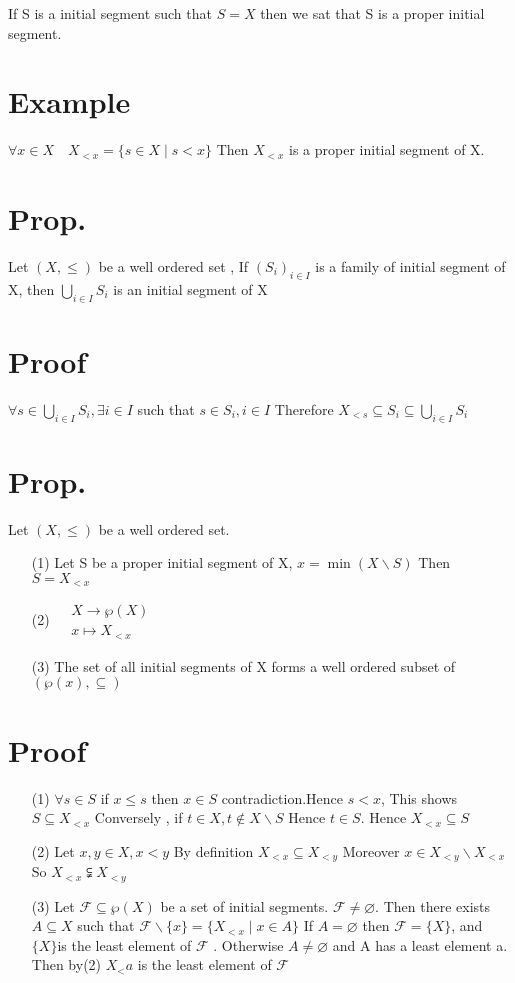 \documentclass{book}
\begin{document}
If S is a initial segment such that $S=X$ then we sat that S is a proper initial segment.
\section{Example}$\forall x\in X\quad X_{<x}=\{s\in X\mid s<x\}$ Then $X_{<x}$ is a proper initial segment of X.
\section{Prop.}Let $(X,\leq)$ be a well ordered set , If $(S_i)_{i\in I}$ is a family of initial segment of X, then $\bigcup\limits_{i\in I}S_i$ is an initial segment of X
\section{Proof}
$\forall s\in \bigcup\limits_{i\in I}S_i,\exists i\in I$ such that $s\in S_i,i\in I$ Therefore $X_{<s}\subseteq S_i\subseteq\bigcup\limits_{i\in I}S_i$
\section{Prop.}
Let $(X,\leq)$ be a well ordered set.
\begin{itemize}
    \item[(1)] Let S be a proper initial segment of X, $x= \min(X\backslash S)$ Then $S=X_{<x}$
    \item[(2)] $\begin{aligned}
        &X\rightarrow\wp(X)\\ &x\mapsto X_{<x}
    \end{aligned}$
    \item[(3)] The set of all initial segments of X forms a well ordered subset of $(\wp(x),\subseteq)$
\end{itemize}
\section{Proof}
\begin{itemize}
    \item [(1)] $\forall s\in S$ if $x\leq s$ then $x\in S$ contradiction.Hence $s<x$, This shows $S\subseteq X_{<x}$ Conversely , if $t\in X, t\not\in X\backslash S$ Hence $t\in S.$ Hence $X_{<x}\subseteq S$
    \item [(2)]Let $x,y\in X,x<y$ By definition $X_{<x}\subseteq X_{<y}$ Moreover $x\in X_{<y}\backslash X_{<x}$ So $X_{<x}\subsetneqq X_{<y}$
    \item [(3)]Let $\mathcal{F}\subseteq\wp(X)$ be a set of initial segments. $\mathcal{F}\not=\varnothing$. Then there exists $A\subseteq X$ such that $\mathcal{F}\backslash \{x\}=\{X_{<x}\mid x\in A\}$ If $A=\varnothing$ then $\mathcal{F}=\{X\}$, and $\{X\}$is the least element of $\mathcal{F}$ . Otherwise $A\not=\varnothing$ and A has a least element a. Then by(2) $X_<a$ is the least element of $\mathcal{F}$
\end{itemize} 
\end{document}
